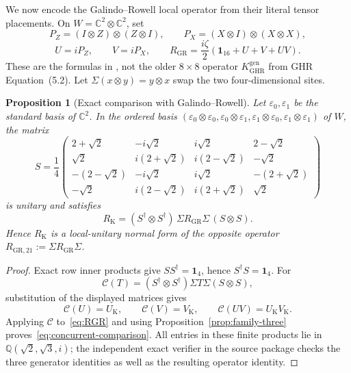 \documentclass[11pt]{article}
\newtheorem{proposition}[theorem]{Proposition}
\theoremstyle{remark}
\newcommand{\Id}{\mathbf 1}
\newcommand{\bbC}{\mathbb C}
\newcommand{\bbQ}{\mathbb Q}
\begin{document}
We now encode the Galindo--Rowell local operator from their literal tensor
placements.  On \(W=\bbC^2\otimes\bbC^2\), set
\[
  P_Z=(I\otimes Z)\otimes(Z\otimes I),\qquad
  P_X=(X\otimes I)\otimes(X\otimes X),
\]
\begin{equation}
  U=iP_Z,\qquad V=iP_X,\qquad
  R_{\mathrm{GR}}=\frac{i\zeta}{2}
  \left(\Id_{16}+U+V+UV\right).
  \label{eq:RGR}
\end{equation}
These are the formulas in \cite[\S13]{GalindoRowell2026}, not the older
\(8\times8\) operator \(K_{\mathrm{GHR}}^{\mathrm{gen}}\) from GHR
Equation~(5.2).
Let \(\Sigma(x\otimes y)=y\otimes x\) swap the two four-dimensional sites.

\begin{proposition}[Exact comparison with Galindo--Rowell]
\label{prop:concurrent-comparison}
Let \(\varepsilon_0,\varepsilon_1\) be the standard basis of \(\bbC^2\).  In
the ordered basis
\((\varepsilon_0\otimes\varepsilon_0,\varepsilon_0\otimes\varepsilon_1,
\varepsilon_1\otimes\varepsilon_0,\varepsilon_1\otimes\varepsilon_1)\) of \(W\),
the matrix
\[
S=\frac14\begin{pmatrix}
2+\sqrt2 & -i\sqrt2 & i\sqrt2 & 2-\sqrt2\\
\sqrt2 & i(2+\sqrt2) & i(2-\sqrt2) & -\sqrt2\\
-(2-\sqrt2) & -i\sqrt2 & i\sqrt2 & -(2+\sqrt2)\\
-\sqrt2 & i(2-\sqrt2) & i(2+\sqrt2) & \sqrt2
\end{pmatrix}
\]
is unitary and satisfies
\begin{equation}
  R_{\mathrm K}
  =(S^\dagger\otimes S^\dagger)\,
    \Sigma R_{\mathrm{GR}}\Sigma\,(S\otimes S).
  \label{eq:concurrent-comparison}
\end{equation}
Hence \(R_{\mathrm K}\) is a local-unitary normal form of the opposite
operator \(R_{\mathrm{GR},21}:=\Sigma R_{\mathrm{GR}}\Sigma\).
\end{proposition}

\begin{proof}
Exact row inner products give \(SS^\dagger=\Id_4\), hence
\(S^\dagger S=\Id_4\).  For
\[
  \mathcal C(T)=(S^\dagger\otimes S^\dagger)\Sigma T\Sigma(S\otimes S),
\]
substitution of the displayed matrices gives
\[
  \mathcal C(U)=U_{\mathrm K},\qquad
  \mathcal C(V)=V_{\mathrm K},\qquad
  \mathcal C(UV)=U_{\mathrm K}V_{\mathrm K}.
\]
Applying \(\mathcal C\) to~\eqref{eq:RGR} and using
Proposition~\ref{prop:family-three} proves~\eqref{eq:concurrent-comparison}.
All entries in these finite products lie in
\(\bbQ(\sqrt2,\sqrt3,i)\); the independent exact verifier in the source
package checks the three generator identities as well as the resulting
operator identity.
\end{proof}
\end{document}
